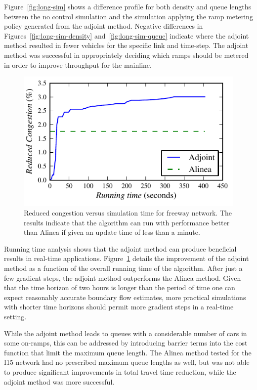 						
Figure~\ref{fig:long-sim} shows a difference profile for both density and queue lengths between the
no control simulation and the simulation applying the ramp metering
policy generated from the adjoint method. Negative differences in
Figures~\ref{fig:long-sim-density} and~\ref{fig:long-sim-queue}
indicate where the adjoint method resulted in fewer vehicles for the
specific link and time-step. The adjoint method was successful in
appropriately deciding which ramps should be metered in order to improve
throughput for the mainline.
\begin{figure}
\begin{centering}
	\includegraphics[width=0.65\columnwidth]{images/longsim}
	\par\end{centering}
	\caption{Reduced congestion versus simulation time for freeway network. The results
		indicate that the algorithm can run with performance better than Alinea
		if given an update time of less than a minute.}\label{fig:running-time}
\end{figure}
								
								
Running time analysis shows that the adjoint method can produce beneficial
results in real-time applications. Figure~\ref{fig:running-time} details the improvement of the adjoint method as a function of the overall running time of the algorithm. After just a few gradient steps, the
adjoint method outperforms the Alinea method. Given that the time
horizon of two hours is longer than the period of time one can expect
reasonably accurate boundary flow estimates, more practical simulations
with shorter time horizons should permit more gradient steps in a
real-time setting.
								
While the adjoint method leads to queues with a considerable number of cars in some on-ramps, this can be addressed by introducing barrier terms into the cost function that limit the
maximum queue length. The Alinea method tested for the I15 network
had no prescribed maximum queue lengths as well, but was not able
to produce significant improvements in total travel time reduction, while the adjoint method was
more successful.
								
